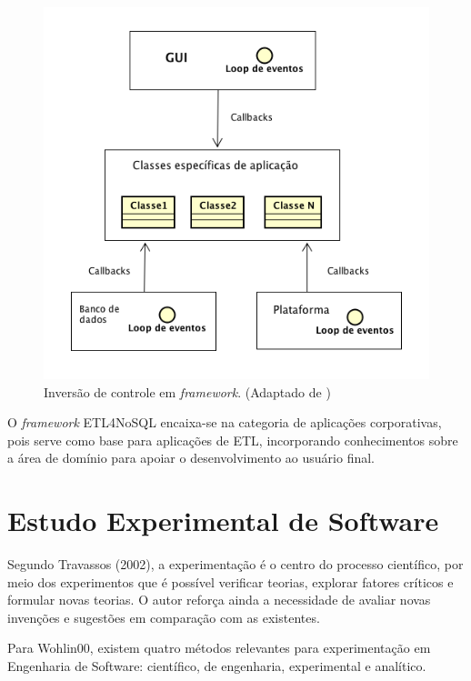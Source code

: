 \begin{figure}[h!]
	\centering
	\includegraphics[scale=0.6]{fig/inversaodecontrole.png}
	\caption{Inversão de controle em \textit{framework}. (Adaptado de \cite{sommerville:2013})}
	\label{inversaodecontrole}
\end{figure}

O \textit{framework} ETL4NoSQL encaixa-se na categoria de aplicações corporativas, pois serve como base para aplicações de ETL, incorporando conhecimentos sobre a área de domínio para apoiar o desenvolvimento ao usuário final.




\section{Estudo Experimental de Software}

Segundo Travassos (2002), a experimentação é o centro do processo científico, por meio dos experimentos que é possível verificar teorias, explorar fatores críticos e formular novas teorias. O autor reforça ainda a necessidade de avaliar novas invenções e sugestões em comparação com as existentes.

Para Wohlin00, existem quatro métodos relevantes para experimentação em Engenharia de Software: científico, de engenharia, experimental e analítico. 

